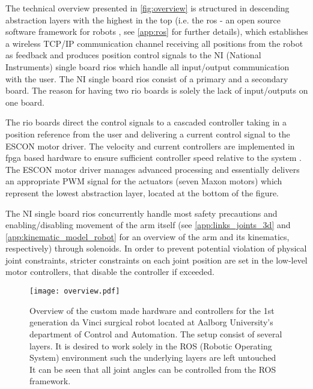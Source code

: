 %
%
The technical overview presented in \autoref{fig:overview} is structured in descending abstraction layers with the highest in the top (i.e. the \gls{ros} - an open source software framework for robots \citep{bib:ros}, see \autoref{app:ros} for further details), which establishes a wireless TCP/IP communication channel receiving all positions from the robot as feedback and produces position control signals to the NI (National Instruments) single board \glspl{rio} which handle all input/output communication with the user. The NI single board \glspl{rio} consist of a primary and a secondary board. The reason for having two \gls{rio} boards is solely the lack of input/outputs on one board.

The \gls{rio} boards direct the control signals to a cascaded controller taking in a position reference from the user and delivering a current control signal to the ESCON motor driver. The velocity and current controllers are implemented in \gls{fpga} based hardware to ensure sufficient controller speed relative to the system \citep{bib:robot_paper}. The ESCON motor driver manages advanced processing and essentially delivers an appropriate PWM signal for the actuators (seven Maxon motors) which represent the lowest abstraction layer, located at the bottom of the figure.

The NI single board \glspl{rio} concurrently handle most safety precautions and enabling/disabling movement of the arm itself (see \autoref{app:links_joints_3d} and \ref{app:kinematic_model_robot} for an overview of the arm and its kinematics, respectively) through solenoids.
%
In order to prevent potential violation of physical joint constraints, stricter constraints on each joint position are set in the low-level motor controllers, that disable the controller if exceeded.

\begin{figure}[H]
	\hspace*{-5mm}
	\texttt{[image: overview.pdf]}	
	\caption{Overview of the custom made hardware and controllers for the 1st generation da Vinci surgical robot located at Aalborg University's department of Control and Automation. The setup consist of several layers. It is desired to work solely in the ROS (Robotic Operating System) environment such the underlying layers are left untouched It can be seen that all joint angles can be controlled from the ROS framework.}
	\label{fig:overview}
\end{figure}

